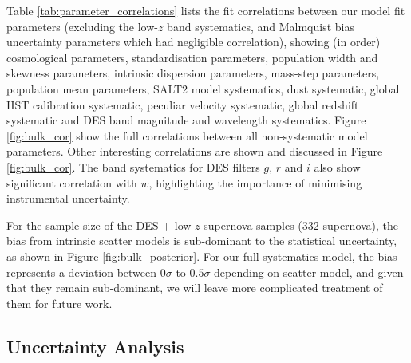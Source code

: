 \documentclass[a4paper,fleqn,usenatbib]{emulateapj}
\newcommand{\gten}{\citetalias{Guy2010}}
\newcommand{\celeven}{\citetalias{Chotard2011}}
\begin{document}



Table \ref{tab:parameter_correlations} lists the fit correlations between our model fit parameters (excluding the low-$z$ band systematics, and Malmquist bias uncertainty parameters which had negligible correlation), showing (in order) cosmological parameters, standardisation parameters, population width and skewness parameters, intrinsic dispersion parameters, mass-step parameters, population mean parameters, SALT2 model systematics, dust systematic, global HST calibration systematic, peculiar velocity systematic, global redshift systematic and DES band magnitude and wavelength systematics. Figure \ref{fig:bulk_cor} show the full correlations between all non-systematic model parameters. Other interesting correlations are shown and discussed in Figure \ref{fig:bulk_cor}. The band systematics for DES filters $g$, $r$ and $i$ also show significant correlation with $w$, highlighting the importance of minimising instrumental uncertainty.


For the sample size of the DES $+$ low-$z$ supernova samples (332 supernova), the bias from intrinsic scatter models is sub-dominant to the statistical uncertainty, as shown in Figure \ref{fig:bulk_posterior}. For our full systematics model, the bias represents a deviation between $0\sigma$ to $0.5\sigma$ depending on scatter model, and given that they remain sub-dominant, we will leave more complicated treatment of them for future work.





\subsection{Uncertainty Analysis}
\label{sec:ucnert}
\end{document}

